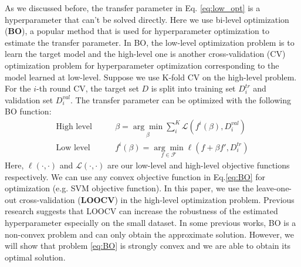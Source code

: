 As we discussed before, the transfer parameter in Eq. \eqref{eq:low_opt} is a hyperparameter that can't be solved directly. 
Here we use bi-level optimization (\textbf{BO})\cite{Pedregosa16}, a popular method that is used for hyperparameter optimization to estimate the transfer parameter. In BO, the low-level optimization problem is to learn the target model and the high-level one is another cross-validation (CV) optimization problem for hyperparameter optimization corresponding to the model learned at low-level.
Suppose we use K-fold CV on the high-level problem. For the $i$-th round CV, the target set $D$ is split into training set $D_i^{tr}$ and validation set $D_i^{val}$. The transfer parameter can be optimized with the following BO function:
\begin{equation}\label{eq:BO}
\begin{aligned}
\text{High level}\qquad&\beta=\underset{\beta}{\arg \min}\sum_i^K\mathcal{L}(f^{i}(\beta),D_i^{val})\\
\text{Low level}\qquad&f^{i}(\beta)=\underset{f \in \mathcal{F}}{\arg \min}\ell\left(f+\beta f',D_i^{tr}\right) 
\end{aligned}
\end{equation} 
Here, $\ell(\cdot,\cdot)$ and $\mathcal{L}(\cdot,\cdot)$ are our low-level and high-level objective functions respectively. We can use any convex objective function in Eq.\eqref{eq:BO} for optimization (e.g. SVM objective function). In this paper, we use the leave-one-out cross-validation (\textbf{LOOCV}) in the high-level optimization problem. Previous research \cite{kuzborskij2013stability} suggests that LOOCV can increase the robustness of the estimated hyperparameter especially on the small dataset.
In some previous works\cite{maclaurin2015gradient,Pedregosa16}, BO is a non-convex problem and can only obtain the approximate solution. However, we will show that problem \eqref{eq:BO} is strongly convex and we are able to obtain its optimal solution. 
